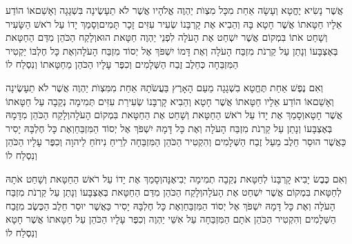 \documentclass[../main/main.tex]{subfiles}
\begin{document}
\begin{multicols*}{\ncols}
אֲשֶׁר נָשִׂיא יֶחֱטָא וְעָשָׂה אַחַת מִכָּל מִצְוֺת יַהְוֶה אֱלֹהָיו אֲשֶׁר לֹא תֵעָשֶׂינָה בִּשְׁגָגָה וְאָשֵׁם\PreVerseSpace{}אוֹ הוֹדַע אֵלָיו חַטָּאתוֹ אֲשֶׁר חָטָא בָּהּ וְהֵבִיא אֶת קָרְבָּנוֹ שְׂעִיר עִזִּים זָכָר תָּמִים\PreVerseSpace{}וְסָמַךְ יָדוֹ עַל רֹאשׁ הַשָּׂעִיר וְשָׁחַט אֹתוֹ בִּמְקוֹם אֲשֶׁר יִשְׁחַט אֶת הָעֹלָה לִפְנֵי יַהְוֶה חַטָּאת הוּא\PreVerseSpace{}וְלָקַח הַכֹּהֵן מִדַּם הַחַטָּאת בְּאֶצְבָּעוֹ וְנָתַן עַל קַרְנֹת מִזְבַּח הָעֹלָה וְאֶת דָּמוֹ יִשְׁפֹּךְ אֶל יְסוֹד מִזְבַּח הָעֹלָה\PreVerseSpace{}וְאֶת כָּל חֶלְבּוֹ יַקְטִיר הַמִּזְבֵּחָה כְּחֵלֶב זֶבַח הַשְּׁלָמִים וְכִפֶּר עָלָיו הַכֹּהֵן מֵחַטָּאתוֹ וְנִסְלַח לוֹ\OpenSection{}\par
{}וְאִם נֶפֶשׁ אַחַת תֶּחֱטָא בִשְׁגָגָה מֵעַם הָאָרֶץ בַּעֲשֹׂתָהּ אַחַת מִמִּצְוֺת יַהְוֶה אֲשֶׁר לֹא תֵעָשֶׂינָה וְאָשֵׁם\PreVerseSpace{}אוֹ הוֹדַע אֵלָיו חַטָּאתוֹ אֲשֶׁר חָטָא וְהֵבִיא קָרְבָּנוֹ שְׂעִירַת עִזִּים תְּמִימָה נְקֵבָה עַל חַטָּאתוֹ אֲשֶׁר חָטָא\PreVerseSpace{}וְסָמַךְ אֶת יָדוֹ עַל רֹאשׁ הַחַטָּאת וְשָׁחַט אֶת הַחַטָּאת בִּמְקוֹם הָעֹלָה\PreVerseSpace{}וְלָקַח הַכֹּהֵן מִדָּמָהּ בְּאֶצְבָּעוֹ וְנָתַן עַל קַרְנֹת מִזְבַּח הָעֹלָה וְאֶת כָּל דָּמָהּ יִשְׁפֹּךְ אֶל יְסוֹד הַמִּזְבֵּחַ\PreVerseSpace{}וְאֶת כָּל חֶלְבָּהּ יָסִיר כַּאֲשֶׁר הוּסַר חֵלֶב מֵעַל זֶבַח הַשְּׁלָמִים וְהִקְטִיר הַכֹּהֵן הַמִּזְבֵּחָה לְרֵיחַ נִיחֹחַ לַיהוָה וְכִפֶּר עָלָיו הַכֹּהֵן וְנִסְלַח לוֹ\OpenSection{}\par
{}וְאִם כֶּבֶשׂ יָבִיא קָרְבָּנוֹ לְחַטָּאת נְקֵבָה תְמִימָה יְבִיאֶנָּה\PreVerseSpace{}וְסָמַךְ אֶת יָדוֹ עַל רֹאשׁ הַחַטָּאת וְשָׁחַט אֹתָהּ לְחַטָּאת בִּמְקוֹם אֲשֶׁר יִשְׁחַט אֶת הָעֹלָה\PreVerseSpace{}וְלָקַח הַכֹּהֵן מִדַּם הַחַטָּאת בְּאֶצְבָּעוֹ וְנָתַן עַל קַרְנֹת מִזְבַּח הָעֹלָה וְאֶת כָּל דָּמָהּ יִשְׁפֹּךְ אֶל יְסוֹד הַמִּזְבֵּחַ\PreVerseSpace{}וְאֶת כָּל חֶלְבָּהּ יָסִיר כַּאֲשֶׁר יוּסַר חֵלֶב הַכֶּשֶׂב מִזֶּבַח הַשְּׁלָמִים וְהִקְטִיר הַכֹּהֵן אֹתָם הַמִּזְבֵּחָה עַל אִשֵּׁי יַהְוֶה וְכִפֶּר עָלָיו הַכֹּהֵן עַל חַטָּאתוֹ אֲשֶׁר חָטָא וְנִסְלַח לוֹ\OpenSection{}\par

\end{multicols*}
\end{document}
